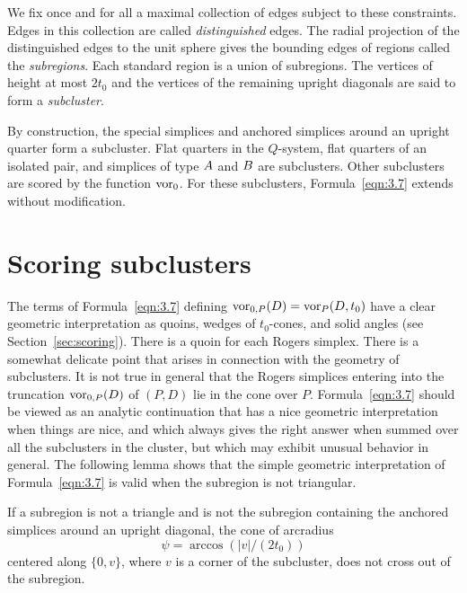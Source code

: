 We fix once and for all a maximal collection of edges subject to
these constraints. Edges in this collection are called {\it
distinguished\/} edges. The radial projection of the distinguished
edges to the unit sphere gives the bounding edges of regions
called the {\it subregions}.  Each standard region is a union of
subregions. The vertices of height at most $2t_0$ and the vertices
of the remaining upright diagonals are said to form a {\it
subcluster}.


By construction, the special simplices and anchored simplices
around an upright quarter form a subcluster.  Flat quarters in the
$Q$-system, flat quarters of an isolated pair, and simplices of
type $A$ and $B$ are subclusters.  Other subclusters are
scored by the function $\operatorname{vor}_0$. For these subclusters,
Formula~\ref{eqn:3.7} extends without modification.

\section{Scoring subclusters}

The terms of Formula~\ref{eqn:3.7} defining
$\operatorname{vor}_{0,P}(D)=\operatorname{vor}_P(D,t_0)$ have a clear geometric
interpretation as quoins, wedges of $t_0$-cones, and solid angles
(see Section~\ref{sec:scoring}). There is a quoin for each Rogers
simplex. There is a somewhat delicate point that arises in
connection with the geometry of subclusters.  It is not true in
general that the Rogers simplices entering into the truncation
$\operatorname{vor}_{0,P}(D)$ of $(P,D)$ lie in the cone over $P$.
Formula~\ref{eqn:3.7} should be viewed as an analytic continuation
that has a nice geometric interpretation when things are nice, and
which always gives the right answer when summed over all the
subclusters in the cluster, but which may exhibit unusual behavior
in general. The following lemma shows that the simple geometric
interpretation of Formula~\ref{eqn:3.7} is valid when the
subregion is not triangular.


\begin{lemma}
    \label{lemma:no-cross}
If a subregion is not a triangle and is not  the subregion
containing the anchored simplices around an upright diagonal, the
cone of arcradius
    $$\psi =\arccos(|v|/(2t_0))$$
centered along $\{0,v\}$, where $v$ is a corner of the subcluster,
does not cross out of the subregion.
\end{lemma}

